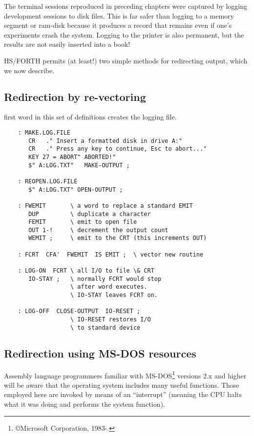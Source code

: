 The terminal sessions reproduced in preceding chapters were captured by logging development sessions to disk files. This is far safer than logging to a memory segment or ram-disk because it produces a record that remains even if one’s experiments crash the system. Logging to the printer is also permanent, but the results are not easily inserted into a book!

HS/FORTH permits (at least!) two simple methods for redirecting output, which we now describe.

\subsection{Redirection by re-vectoring}
 first word in this set of definitions creates the logging file.

\begin{lstlisting}
    : MAKE.LOG.FILE
       CR   ." Insert a formatted disk in drive A:"
       CR   ." Press any key to continue, Esc to abort..."
       KEY 27 = ABORT" ABORTED!"
       $" A:LOG.TXT"   MAKE-OUTPUT ;

    : REOPEN.LOG.FILE
       $" A:LOG.TXT" OPEN-OUTPUT ;

    : FWEMIT       \ a word to replace a standard EMIT
       DUP         \ duplicate a character
       FEMIT       \ emit to open file
       OUT 1-!     \ decrement the output count
       WEMIT ;     \ emit to the CRT (this increments OUT)

    : FCRT  CFA'  FWEMIT  IS EMIT ;  \ vector new routine

    : LOG-ON  FCRT \ all I/O to file \& CRT
       IO-STAY ;   \ normally FCRT would stop
                   \ after word executes.
                   \ IO-STAY leaves FCRT on.

    : LOG-OFF  CLOSE-OUTPUT  IO-RESET ;
                   \ IO-RESET restores I/O
                   \ to standard device
\end{lstlisting}

\subsection{Redirection using MS-DOS resources}

Assembly language programmers familiar with MS-DOS\footnote{\copyright Microsoft Corporation, 1983-.} versions 2.x and higher will be aware that the operating system includes many useful functions. Those employed here are invoked by means of an ``interrupt'' (meaning the CPU halts what it was doing and performs the system function).

